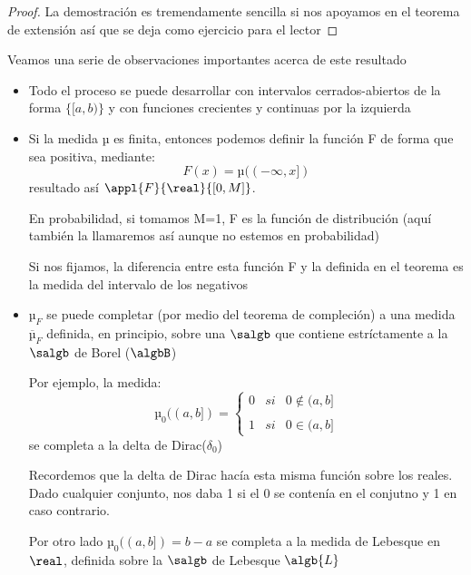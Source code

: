 \documentclass{apuntes}
\begin{document}
\begin{proof}
La demostración es tremendamente sencilla si nos apoyamos en el teorema de extensión así que se deja como ejercicio para el lector

\end{proof}

Veamos una serie de observaciones importantes acerca de este resultado
\begin{obs}
\begin{itemize}
\item Todo el proceso se puede desarrollar con intervalos cerrados-abiertos de la forma $\{[a,b)\}$ y con funciones crecientes y continuas por la izquierda

\item Si la medida µ es finita, entonces podemos definir la función F de forma que sea positiva, mediante:
\[F(x)=µ((- \infty, x])\]
resultado así $\appl{F}{\real}{[0,M]}$.

En probabilidad, si tomamos M=1, F es la función de distribución (aquí también la llamaremos así aunque no estemos en probabilidad)

Si nos fijamos, la diferencia entre esta función F y la definida en el teorema es la medida del intervalo de los negativos

\item $µ_F$ se puede completar (por medio del teorema de compleción) a una medida $\overline{µ}_F$ definida, en principio, sobre una $\salgb$ que contiene estríctamente a la $\salgb$ de Borel ($\algbB$)

Por ejemplo, la medida:
\[µ_0((a,b])= \left\{ \begin{array}{lcc}
            0 &   si  & 0 \notin (a,b] \\
             \\  1 &  si & 0 \in (a,b]
             \end{array}
   \right.\]
se completa a la delta de Dirac($\delta_0$)

Recordemos que la delta de Dirac hacía esta misma función sobre los reales. Dado cualquier conjunto, nos daba 1 si el 0 se contenía en el conjutno y 1 en caso contrario.

Por otro lado $µ_0((a,b])=b-a$ se completa a la medida de Lebesque en $\real$, definida sobre la $\salgb$ de Lebesque $\algb{L}$
\end{itemize}
\end{obs}

\end{document}
